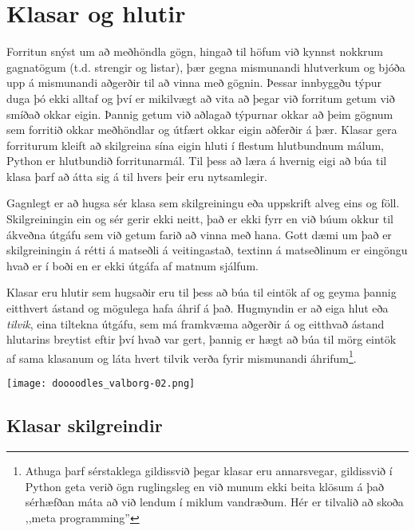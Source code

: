 
\chapter{Klasar og hlutir}\label{k:klasar}
Forritun snýst um að meðhöndla gögn, hingað til höfum við kynnst nokkrum gagnatögum (t.d. strengir og listar), þær gegna mismunandi hlutverkum og bjóða upp á mismunandi aðgerðir til að vinna með gögnin.
Þessar innbyggðu týpur duga þó ekki alltaf og því er mikilvægt að vita að þegar við forritum getum við smíðað okkar eigin.
Þannig getum við aðlagað týpurnar okkar að þeim gögnum sem forritið okkar meðhöndlar og útfært okkar eigin aðferðir á þær.
Klasar gera forriturum kleift að skilgreina sína eigin hluti í flestum hlutbundnum málum, Python er hlutbundið forritunarmál.
Til þess að læra á hvernig eigi að búa til klasa þarf að átta sig á til hvers þeir eru nytsamlegir.

Gagnlegt er að hugsa sér klasa sem skilgreiningu eða uppskrift alveg eins og föll.
Skilgreiningin ein og sér gerir ekki neitt, það er ekki fyrr en við búum okkur til ákveðna útgáfu sem við getum farið að vinna með hana.
Gott dæmi um það er skilgreiningin á rétti á matseðli á veitingastað, textinn á matseðlinum er eingöngu hvað er í boði en er ekki útgáfa af matnum sjálfum.

Klasar eru hlutir sem hugsaðir eru til þess að búa til eintök af og geyma þannig eitthvert ástand og mögulega hafa áhrif á það.
Hugmyndin er að eiga hlut eða \emph{tilvik}, eina tiltekna útgáfu, sem má framkvæma aðgerðir á og eitthvað ástand hlutarins breytist eftir því hvað var gert, þannig er hægt að búa til mörg eintök af sama klasanum og láta hvert tilvik verða fyrir mismunandi áhrifum\footnote{Athuga þarf sérstaklega gildissvið þegar klasar eru annarsvegar, gildissvið í Python geta verið ögn ruglingsleg en við munum ekki beita klösum á það sérhæfðan máta að við lendum í miklum vandræðum.
Hér er tilvalið að skoða ,,meta programming''}.


\phantom{easter egg}
\begin{center}
	\texttt{[image: doooodles\_valborg-02.png]}
\end{center}
\section{Klasar skilgreindir}\label{uk:klasar-skilgreindir}

